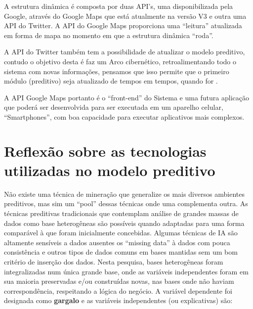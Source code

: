 A estrutura dinâmica é composta por duas API's, uma disponibilizada pela Google, através do Google Maps que está atualmente na versão V3 e 
outra uma API do Twitter. A API do Google Maps proporciona uma ``leitura'' atualizada em forma de mapa no momento em que a estrutura dinâmica ``roda''. 

A API do Twitter também tem a possibilidade de atualizar o modelo preditivo, contudo o objetivo desta é faz um Arco cibernético, 
retroalimentando todo o sistema com novas informações, pensamos que isso permite que o primeiro módulo (preditivo) seja atualizado de 
tempos em tempos, quando for .

A API Google Maps portanto é o ``front-end'' do Sistema e uma futura aplicação que poderá ser desenvolvida para ser executada em um aparelho 
celular, ``Smartphones'', com boa capacidade para executar aplicativos mais complexos.

\pagebreak

\section{ Reflexão sobre as tecnologias utilizadas no modelo preditivo}\label{result}

Não existe uma técnica de mineração que generalize os mais diversos ambientes preditivos, mas sim um ``pool'' dessas técnicas onde uma complementa outra.
As técnicas preditivas tradicionais que contemplam análise de grandes massas de dados como base heterogêneas são possíveis quando adaptadas para uma forma comparável à que
foram inicialmente concebidas. Algumas técnicas de IA são altamente sensíveis a dados ausentes os ``missing data'' à dados com pouca consistência e outros tipos de dados 
comuns em bases mantidas sem um bom critério de inserção dos dados. Nesta pesquisa, bases heterogêneas foram integralizadas num única grande base, onde as variáveis independentes foram
em sua maioria preservadas e/ou construídas novas, nas bases onde não haviam correspondência, respeitando a lógica do negócio. 
A variável dependente foi designada como \textbf{gargalo} e as variáveis independentes (ou explicativas) são:

